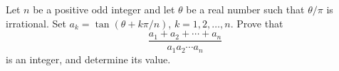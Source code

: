 Let $n$ be a positive odd integer and let $\theta$ be a real number such
that $\theta/\pi$ is irrational. Set $a_k = \tan (\theta + k \pi/n)$,
$k=1,2,\dots,n$. Prove that
\[
\frac{a_1 + a_2 + \cdots + a_n}{a_1 a_2 \cdots a_n}
\]
is an integer, and determine its value.
